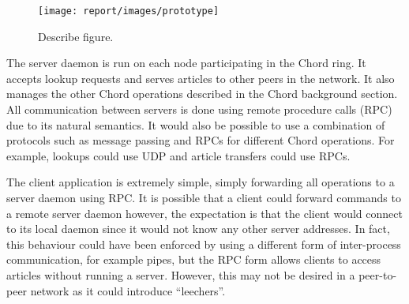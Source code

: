 \documentclass[twocolumn]{article}
\begin{document}
\begin{figure}[tbh!]
  \centering
  \texttt{[image: report/images/prototype]}
  \caption{Describe figure.\label{fig:prototype}}
\end{figure}


The server daemon is run on each node participating in the Chord ring. It accepts lookup requests and serves articles to other peers in the network. It also manages the other Chord operations described in the Chord background section. All communication between servers is done using remote procedure calls (RPC) due to its natural semantics. It would also be possible to use a combination of protocols such as message passing and RPCs for different Chord operations. For example, lookups could use UDP and article transfers could use RPCs.

The client application is extremely simple, simply forwarding all operations to a server daemon using RPC. It is possible that a client could forward commands to a remote server daemon however, the expectation is that the client would connect to its local daemon since it would not know any other server addresses. In fact, this behaviour could have been enforced by using a different form of inter-process communication, for example pipes, but the RPC form allows clients to access articles without running a server. However, this may not be desired in a peer-to-peer network as it could introduce “leechers”.
\end{document}
